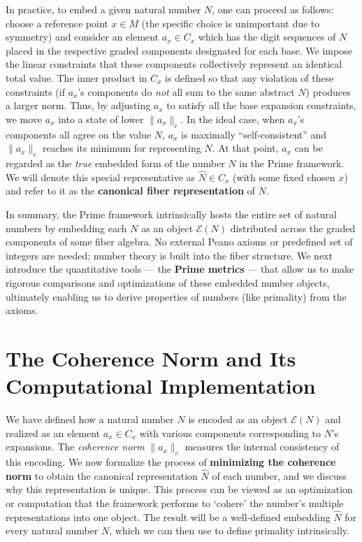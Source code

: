 \documentclass[11pt]{article}
\begin{document}
In practice, to embed a given natural number $N$, one can proceed as follows: choose a reference point $x \in M$ (the specific choice is unimportant due to symmetry) and consider an element $a_x \in C_x$ which has the digit sequences of $N$ placed in the respective graded components designated for each base. We impose the linear constraints that these components collectively represent an identical total value. The inner product in $C_x$ is defined so that any violation of these constraints (if $a_x$'s components do \emph{not} all sum to the same abstract $N$) produces a larger norm. Thus, by adjusting $a_x$ to satisfy all the base expansion constraints, we move $a_x$ into a state of lower $\|a_x\|_c$. In the ideal case, when $a_x$'s components all agree on the value $N$, $a_x$ is maximally “self-consistent” and $\|a_x\|_c$ reaches its minimum for representing $N$. At that point, $a_x$ can be regarded as the \emph{true} embedded form of the number $N$ in the Prime framework. We will denote this special representative as $\hat{N} \in C_x$ (with some fixed chosen $x$) and refer to it as the \textbf{canonical fiber representation} of $N$.

In summary, the Prime framework intrinsically hosts the entire set of natural numbers by embedding each $N$ as an object $\mathcal{E}(N)$ distributed across the graded components of some fiber algebra. No external Peano axioms or predefined set of integers are needed; number theory is built into the fiber structure. We next introduce the quantitative tools --- the \textbf{Prime metrics} --- that allow us to make rigorous comparisons and optimizations of these embedded number objects, ultimately enabling us to derive properties of numbers (like primality) from the axioms.

\section{The Coherence Norm and Its Computational Implementation}

We have defined how a natural number $N$ is encoded as an object $\mathcal{E}(N)$ and realized as an element $a_x \in C_x$ with various components corresponding to $N$'s expansions. The \emph{coherence norm} $\|a_x\|_c$ measures the internal consistency of this encoding. We now formalize the process of \textbf{minimizing the coherence norm} to obtain the canonical representation $\hat{N}$ of each number, and we discuss why this representation is unique. This process can be viewed as an optimization or computation that the framework performs to `cohere' the number's multiple representations into one object. The result will be a well-defined embedding $\hat{N}$ for every natural number $N$, which we can then use to define primality intrinsically.
\end{document}
